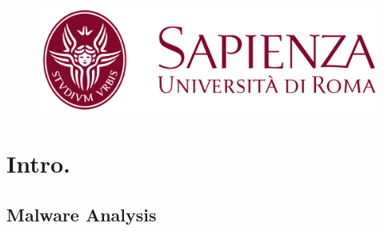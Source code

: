 \documentclass[compress]{beamer}
\begin{document}
\newcommand{\stt}{\small\tt}
\newcommand{\word}[1]{\fontsize{10.4}{10}\textsf{#1}}        %
\newcommand{\wordb}[2]{\fontsize{10.4}{10}\textsf{#1}$_#2$}        %
\newcommand{\wordc}[3]{\fontsize{10.4}{10}\textsf{#1}$_#2^#3$}        %
\newcommand{\wikipage}[1]{\textsc{#1}}        %

\newcommand\tab[1][0.5cm]{\hspace*{#1}}

\begin{frame}
 
 \begin{figure}
     \centering
    \vspace{0.5cm}
     \includegraphics[scale=.40]{image/sapienza.png}\\
    
 \end{figure}
 
\titlepage
\end{frame}


\section{Intro.}

\subsection{Malware Analysis}
\end{document}
